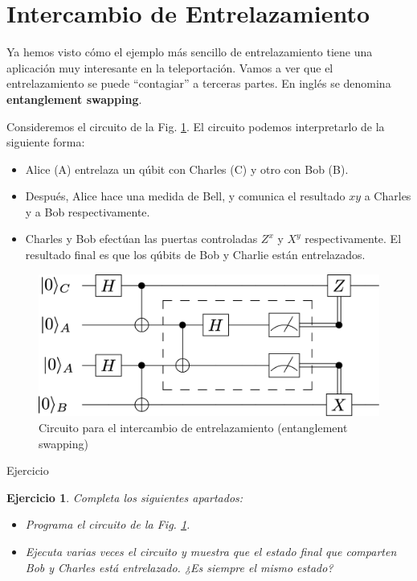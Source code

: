 \documentclass[a4paper,11pt]{book} %
\newtheorem{ejercicio_contador}{Ejercicio}
\newcommand{\Ejercicio}[1]{
		\begin{mybox_gray}{Ejercicio} 
			\begin{ejercicio_contador}
				 #1 
			\end{ejercicio_contador} 
		\end{mybox_gray}
	}
\numberwithin{equation}{chapter}
\begin{document}
    
    \section{Intercambio de Entrelazamiento}

Ya hemos visto cómo el ejemplo más sencillo de entrelazamiento tiene una aplicación muy interesante en la teleportación. Vamos a ver que el entrelazamiento se puede ``contagiar'' a terceras partes. En inglés se denomina \textbf{entanglement swapping}.

Consideremos el circuito de la Fig. \ref{Fig_entrelazamiento_entanglement_swap}. El circuito podemos interpretarlo de la siguiente forma:
	\begin{itemize}
		\item[1.] Alice (A) entrelaza un qúbit con Charles (C) y otro con Bob (B).
		
		\item[2.] Después, Alice hace una medida de Bell, y comunica el resultado $xy$ a Charles 
		y a Bob respectivamente.
		
		\item[3.] Charles y Bob efectúan las puertas controladas $Z^x$ y $X^y$ respectivamente. El resultado final es que los qúbits de Bob y Charlie están entrelazados.
	\end{itemize}


	\begin{figure}[H]
	\centering 
	\includegraphics[width=0.45\linewidth]{Figuras/Fig_entrelazamiento_entanglement_swap.png}
	\caption{Circuito para el intercambio de entrelazamiento (entanglement swapping)}
	\label{Fig_entrelazamiento_entanglement_swap}
	\end{figure}


	\Ejercicio{
	Completa los siguientes apartados:
	\begin{itemize}
	\item[a)] Programa el circuito de la Fig. \ref{Fig_entrelazamiento_entanglement_swap}.
	\item[b)] Ejecuta varias veces el circuito y muestra que el estado final que comparten Bob y Charles está entrelazado. ¿Es siempre el mismo estado?
	\end{itemize}
	}
	
\end{document}
